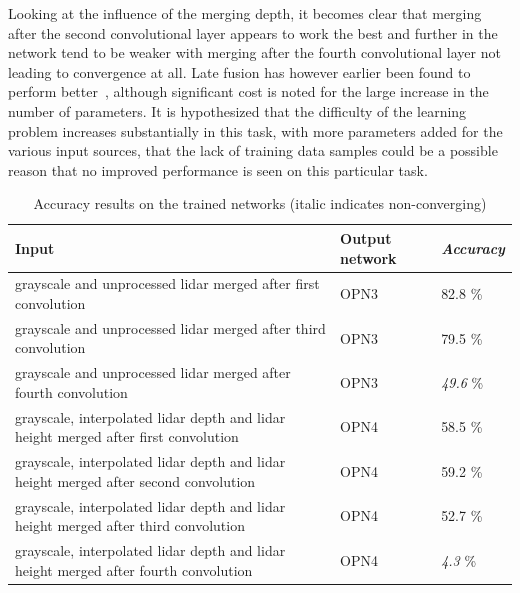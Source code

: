 Looking at the influence of the merging depth, it becomes clear that merging after the second convolutional layer appears to work the best and further in the network tend to be weaker with merging after the fourth convolutional layer not leading to convergence at all. Late fusion has however earlier been found to perform better~\cite{schlosser2016}, although significant cost is noted for the large increase in the number of parameters. It is hypothesized that the difficulty of the learning problem increases substantially in this task, with more parameters added for the various input sources, that the lack of training data samples could be a possible reason that no improved performance is seen on this particular task. 

\begin{table}[]
\centering
\caption{Accuracy results on the trained networks (italic indicates non-converging)}
\label{tab:merge_results}
\begin{tabular}{|p{7.5cm}|p{2cm}|p{2cm}|}
\hline
\textbf{Input}                                                          & \textbf{Output network} & \textit{\textbf{Accuracy}} \\ \hline
grayscale and unprocessed lidar merged after first convolution          & OPN3                    & 82.8 \%                   \\ \hline
grayscale and unprocessed lidar merged after third convolution          & OPN3                    & 79.5 \%                   \\ \hline
grayscale and unprocessed lidar merged after fourth convolution         & OPN3                    & \textit{49.6} \%          \\ \hline
grayscale, interpolated lidar depth and lidar height merged after first convolution          & OPN4                    & 58.5 \%                   \\ \hline
grayscale, interpolated lidar depth and lidar height merged after second convolution         & OPN4                    & 59.2 \%                   \\ \hline
grayscale, interpolated lidar depth and lidar height merged after third convolution          & OPN4                    & 52.7 \%                   \\ \hline
grayscale, interpolated lidar depth and lidar height merged after fourth convolution         & OPN4                    & \textit{4.3} \%                   \\ \hline
\end{tabular}
\end{table}

